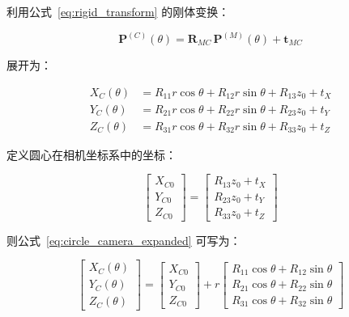 \documentclass[12pt,a4paper]{article}
\begin{document}
利用公式~\eqref{eq:rigid_transform} 的刚体变换：

\begin{equation}
\mathbf{P}^{(C)}(\theta) =
\mathbf{R}_{MC} \, \mathbf{P}^{(M)}(\theta) + \mathbf{t}_{MC}
\label{eq:circle_camera}
\end{equation}

展开为：

\begin{equation}
\begin{aligned}
X_C(\theta) &= R_{11} r \cos\theta + R_{12} r \sin\theta + R_{13} z_0 + t_X \\
Y_C(\theta) &= R_{21} r \cos\theta + R_{22} r \sin\theta + R_{23} z_0 + t_Y \\
Z_C(\theta) &= R_{31} r \cos\theta + R_{32} r \sin\theta + R_{33} z_0 + t_Z
\end{aligned}
\label{eq:circle_camera_expanded}
\end{equation}

定义圆心在相机坐标系中的坐标：

\begin{equation}
\begin{bmatrix}
X_{C0} \\ Y_{C0} \\ Z_{C0}
\end{bmatrix}
=
\begin{bmatrix}
R_{13} z_0 + t_X \\
R_{23} z_0 + t_Y \\
R_{33} z_0 + t_Z
\end{bmatrix}
\label{eq:circle_center_camera}
\end{equation}

则公式~\eqref{eq:circle_camera_expanded} 可写为：

\begin{equation}
\begin{bmatrix}
X_C(\theta) \\ Y_C(\theta) \\ Z_C(\theta)
\end{bmatrix}
=
\begin{bmatrix}
X_{C0} \\ Y_{C0} \\ Z_{C0}
\end{bmatrix}
+
r
\begin{bmatrix}
R_{11} \cos\theta + R_{12} \sin\theta \\
R_{21} \cos\theta + R_{22} \sin\theta \\
R_{31} \cos\theta + R_{32} \sin\theta
\end{bmatrix}
\label{eq:circle_camera_simplified}
\end{equation}
\end{document}
